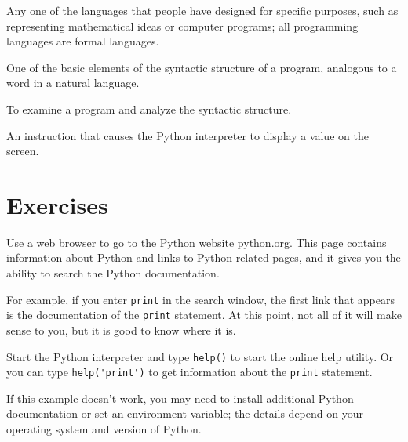 \begin{vocabulary}  Any one of the languages that people have designed
	for specific purposes, such as representing mathematical ideas or
	computer programs; all programming languages are formal languages.
\end{vocabulary}
	
\begin{vocabulary}[token:]  One of the basic elements of the syntactic structure of
	a program, analogous to a word in a natural language.
\end{vocabulary}
	
\begin{vocabulary}[parse:]  To examine a program and analyze the syntactic structure.
\end{vocabulary}
	
\begin{vocabulary}  An instruction that causes the Python
	interpreter to display a value on the screen.
\end{vocabulary}


\section{Exercises}

\begin{exercise}
	Use a web browser to go to the Python website \url{python.org}.
	This page contains information about Python and links
	to Python-related pages, and it gives you the ability to search
	the Python documentation.
	
	For example, if you enter {\tt print} in the search window, the
	first link that appears is the documentation of the {\tt print}
	statement.  At this point, not all of it will make sense to you,
	but it is good to know where it is.
	
\end{exercise}

\begin{exercise}
	Start the Python interpreter and type {\tt help()} to start the online
	help utility.  Or you can type \verb"help('print')" to get information
	about the {\tt print} statement.
	
	If this example doesn't work, you
	may need to install additional Python documentation or set an
	environment variable; the details depend on your operating system and
	version of Python.
	
\end{exercise}


